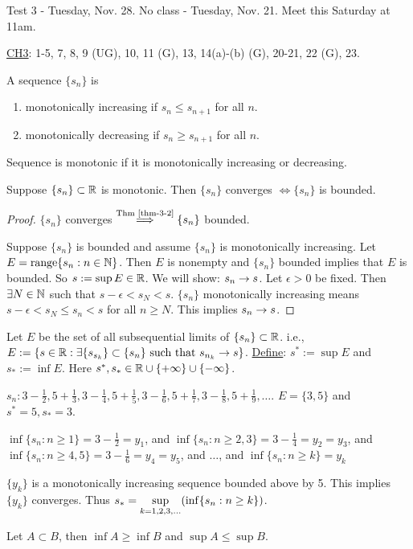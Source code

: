 \documentclass[]{article}
\begin{document}
Test 3 - Tuesday, Nov. 28. 
No class - Tuesday, Nov. 21. 
Meet this Saturday at 11am.

\ul{CH3}: 1-5, 7, 8, 9 (UG), 10, 11 (G), 13, 14(a)-(b) (G), 20-21, 22 (G), 23.

\begin{definition}
	A sequence $\{s_n\}$ is
	\begin{enumerate}
		\item monotonically increasing if $s_n\leq s_{n+1}$ for all $n$.
		\item monotonically decreasing if $s_n\geq s_{n+1}$ for all $n$.
	\end{enumerate}
	Sequence is monotonic if it is monotonically increasing or decreasing.
\end{definition}
\begin{theorem}
	Suppose $\{s_n\}\subset\mathbb{R}$ is monotonic. Then $\{s_n\}$ converges $\iff \{s_n\}$ is bounded.
\end{theorem}
\begin{proof}
	\say{$\implies$} $\{s_n\}$ converges $\overset{\text{Thm \ref{thm-3-2}}}{\implies} \{s_n\}$ bounded.

	\say{$\Lla$} Suppose $\{s_n\}$ is bounded and assume $\{s_n\}$ is monotonically increasing.
	Let $E = \text{range}\{s_n:n\in\mathbb{N}\}$. Then $E$ is nonempty and $\{s_n\}$ bounded implies that $E$ is bounded.
	So $s:=\sup E\in\mathbb{R}$. We will show: $s_n\rightarrow s$.
	Let $\epsilon>0$ be fixed. Then $\exists N\in\mathbb{N}$ such that $s-\epsilon< s_N< s$.
	$\{s_n\}$ monotonically increasing means $s-\epsilon< s_N\leq s_n < s$ for all $n\geq N$.
	This implies $s_n\rightarrow s$.
\end{proof}

\begin{definition}
	Let $E$ be the set of all subsequential limits of $\{s_n\}\subset\mathbb{R}$.
	i.e., $E:=\{s\in\mathbb{R}:\exists\{s_{s_k}\}\subset\{s_n\} \text{ such that } s_{n_k}\rightarrow s\}$.
	\ul{Define}: $s^*:= \sup E$ and $s_*:=\inf E$. Here $s^*,s_*\in\mathbb{R}\cup\{+\infty\}\cup\{-\infty\}$.
\end{definition}
\begin{example}
	$s_n: 3-\frac{1}{2},5+\frac{1}{3},3-\frac{1}{4},5+\frac{1}{5},3-\frac{1}{6},5+\frac{1}{7},3-\frac{1}{8},5+\frac{1}{9},\dots$.
	$E = \{3,5\}$ and $s^* = 5, s_* = 3$.

	$\inf\{s_n:n\geq 1\} = 3 - \frac{1}{2} = y_1$, and 
	$\inf\{s_n:n\geq 2,3\} = 3-\frac{1}{4} = y_2=y_3$, and
	$\inf\{s_n:n\geq 4,5\} = 3-\frac{1}{6} = y_4=y_5$, and 
	$\dots$, and
	$\inf\{s_n:n\geq k\} = y_k$
	\begin{note}
		$\{y_k\}$ is a monotonically increasing sequence bounded above by 5.
		This implies $\{y_k\}$ converges.
		Thus $s_* = \underset{k=1,2,3,\dots}{\sup}(\inf\{s_n:n\geq k\})$.
	\end{note}
\end{example}
\begin{recall}
	Let $A\subset B$, then $\inf A\geq \inf B$ and $\sup A\leq \sup B$.
\end{recall}
\end{document}
